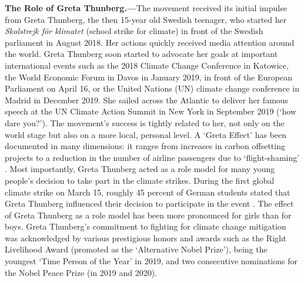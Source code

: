 \textbf{The Role of Greta Thunberg.---}The movement received its initial impulse from Greta Thunberg, the then 15-year old Swedish teenager, who started her \textit{Skolstrejk för klimatet} (school strike for climate) in front of the Swedish parliament in August 2018. Her actions quickly received media attention around the world. Greta Thunberg soon started to advocate her goals at important international events such as the 2018 Climate Change Conference in Katowice, the World Economic Forum in Davos in January 2019, in front of the European Parliament on April 16, or the United Nations (UN) climate change conference in Madrid in December 2019. She sailed across the Atlantic to deliver her famous speech at the UN Climate Action Summit in New York in September 2019 (`how dare you?'). The movement's success is tightly related to her, not only on the world stage but also on a more local, personal level. A `Greta Effect' has been documented in many dimensions: it ranges from increases in carbon offsetting projects \citep{guardian2019greta_effect} to a reduction in the number of airline passengers due to `flight-shaming' \citep{economist2019greta_effect}. Most importantly, Greta Thunberg acted as a role model for many young people's decision to take part in the climate strikes. During the first global climate strike on March 15, roughly 45 percent of German students stated that Greta Thunberg influenced their decision to participate in the event \citep{sommer2019fridays}. The effect of Greta Thunberg as a role model has been more pronounced for girls than for boys. Greta Thunberg's commitment to fighting for climate change mitigation was acknowledged by various prestigious honors and awards such as the Right Livelihood Award (promoted as the `Alternative Nobel Prize'), being the youngest `Time Person of the Year' in 2019, and two consecutive nominations for the Nobel Peace Prize (in 2019 and 2020).


